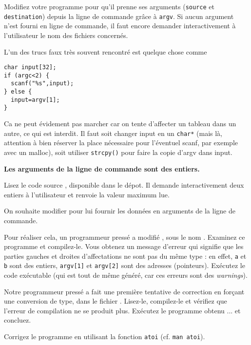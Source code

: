 \documentclass[10pt]{article}\usepackage[correction,nu]{esial}
\begin{document}
\Question Modifiez votre programme pour qu'il prenne ses arguments
(\texttt{source} et \texttt{destination}) depuis la ligne de commande grâce à
\texttt{argv}. Si aucun argument n'est fourni en ligne de commande, il faut
encore demander interactivement à l'utilisateur le nom des fichiers concernés.

\begin{Reponse}
  L'un des trucs faux très souvent rencontré est quelque chose comme
  \begin{Verbatim}
char input[32];
if (argc<2) {
  scanf("%s",input); 
} else {
  input=argv[1];
}
  \end{Verbatim}
Ca ne peut évidement pas marcher car on tente d'affecter un tableau dans un
autre, ce qui est interdit. Il faut soit changer input en un \texttt{char*}
(mais là, attention à bien réserver la place nécessaire pour l'éventuel scanf,
par exemple avec un malloc), soit utiliser \texttt{strcpy()} pour faire la
copie d'argv dans input.
\end{Reponse}


\Exercice\textbf{Les arguments de la ligne de commande sont des entiers.}

Lisez le code source , disponible dans le dépot. Il demande
interactivement deux entiers à l'utilisateur et renvoie la valeur maximum lue.

On souhaite modifier  pour lui fournir les données en arguments de
la ligne de commande.

\Question Pour réaliser cela, un programmeur pressé a modifié ,
sous le nom . Examinez ce programme et compilez-le. Vous
obtenez un message d'erreur qui signifie que les parties gauches et droites
d'affectations ne sont pas du même type : en effet, {\tt a} et {\tt b} sont des
entiers, {\tt argv[1]} et {\tt argv[2]} sont des adresses (pointeurs). Exécutez
le code exécutable (qui est tout de même généré, car ces erreurs sont des {\em
  warnings}).

\Question Notre programmeur pressé a fait une première tentative de correction
en forçant une conversion de type, dans le fichier . Lisez-le,
compilez-le et vérifiez que l'erreur de compilation ne se produit plus.
Exécutez le programme obtenu ... et concluez.

\Question Corrigez le programme en utilisant la fonction \texttt{atoi}
(cf. \texttt{man atoi}).
\end{document}
